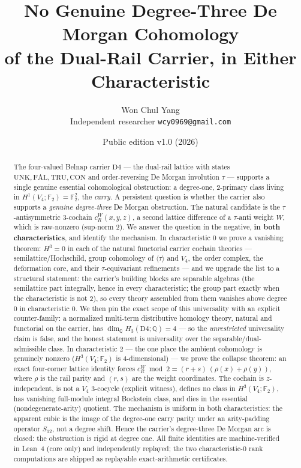 \documentclass[11pt]{article}
\title{No Genuine Degree-Three De Morgan Cohomology\\ of the Dual-Rail Carrier, in Either Characteristic}
\author{Won Chul Yang\\ \small Independent researcher \quad \texttt{wcy0969@gmail.com}}
\date{Public edition v1.0 (2026)}
\theoremstyle{definition}
\theoremstyle{remark}
\newcommand{\F}{\mathbb{F}}
\newcommand{\Q}{\mathbb{Q}}
\newcommand{\UNK}{\mathrm{UNK}}
\newcommand{\TRU}{\mathrm{TRU}}
\newcommand{\FAL}{\mathrm{FAL}}
\newcommand{\CON}{\mathrm{CON}}
\newcommand{\Dfour}{\mathrm{D4}}
\newcommand{\cR}{c_R^W}
\begin{document}
\maketitle

\begin{abstract}
The four-valued Belnap carrier $\Dfour$ --- the dual-rail lattice with states $\UNK,\FAL,\TRU,\CON$ and order-reversing De Morgan involution $\tau$ --- supports a single genuine essential cohomological obstruction: a degree-one, $2$-primary class living in $H^1(V_4;\F_2)=\F_2^2$, the \emph{carry}. A persistent question is whether the carrier also supports a \emph{genuine degree-three} De Morgan obstruction. The natural candidate is the $\tau$-antisymmetric $3$-cochain $\cR(x,y,z)$, a second lattice difference of a $\tau$-anti weight $W$, which is raw-nonzero (sup-norm $2$). We answer the question in the negative, \textbf{in both characteristics}, and identify the mechanism. In characteristic $0$ we prove a vanishing theorem: $H^3=0$ in each of the natural functorial carrier cochain theories --- semilattice/Hochschild, group cohomology of $\langle\tau\rangle$ and $V_4$, the order complex, the deformation core, and their $\tau$-equivariant refinements --- and we upgrade the list to a structural statement: the carrier's building blocks are separable algebras (the semilattice part integrally, hence in every characteristic; the group part exactly when the characteristic is not $2$), so every theory assembled from them vanishes above degree $0$ in characteristic $0$. We then pin the exact scope of this universality with an explicit counter-family: a normalized multi-term distributive homology theory, natural and functorial on the carrier, has $\dim_\Q H_3(\Dfour;\Q)=4$ --- so the \emph{unrestricted} universality claim is false, and the honest statement is universality over the separable/dual-admissible class. In characteristic $2$ --- the one place the ambient cohomology is genuinely nonzero ($H^3(V_4;\F_2)$ is $4$-dimensional) --- we prove the collapse theorem: an exact four-corner lattice identity forces $\cR \bmod 2 = (r{+}s)\,(\rho(x)+\rho(y))$, where $\rho$ is the rail parity and $(r,s)$ are the weight coordinates. The cochain is $z$-independent, is not a $V_4$ $3$-cocycle (explicit witness), defines no class in $H^3(V_4;\F_2)$, has vanishing full-module integral Bockstein class, and dies in the essential (nondegenerate-arity) quotient. The mechanism is uniform in both characteristics: the apparent cubic is the image of the degree-one carry parity under an arity-padding operator $S_{12}$, not a degree shift. Hence the carrier's degree-three De Morgan arc is closed: the obstruction is rigid at degree one. All finite identities are machine-verified in Lean~4 (core only) and independently replayed; the two characteristic-$0$ rank computations are shipped as replayable exact-arithmetic certificates.
\end{abstract}
\end{document}
